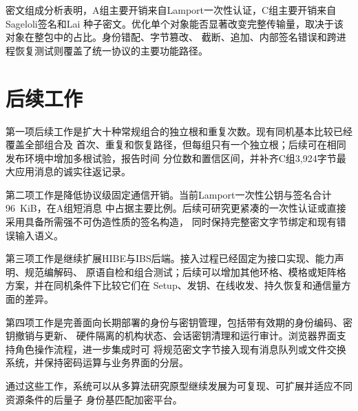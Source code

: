密文组成分析表明，A组主要开销来自Lamport一次性认证，C组主要开销来自Sageloli签名和Lai
种子密文。优化单个对象能否显著改变完整传输量，取决于该对象在整包中的占比。身份错配、字节篡改、
截断、追加、内部签名错误和跨进程恢复测试则覆盖了统一协议的主要功能路径。

\section{后续工作}

第一项后续工作是扩大十种常规组合的独立根和重复次数。现有同机基本比较已经覆盖全部组合及
首次、重复和恢复路径，但每组只有一个独立根；后续可在相同发布环境中增加多根试验，报告时间
分位数和置信区间，并补齐C组3,924字节最大应用消息的诚实往返记录。

第二项工作是降低协议级固定通信开销。当前Lamport一次性公钥与签名合计96~KiB，在A组短消息
中占据主要比例。后续可研究更紧凑的一次性认证或直接采用具备所需强不可伪造性质的签名构造，
同时保持完整密文字节绑定和现有错误输入语义。

第三项工作是继续扩展HIBE与IBS后端。接入过程已经固定为接口实现、能力声明、规范编解码、
原语自检和组合测试；后续可以增加其他环格、模格或矩阵格方案，并在同机条件下比较它们在
Setup、发钥、在线收发、持久恢复和通信量方面的差异。

第四项工作是完善面向长期部署的身份与密钥管理，包括带有效期的身份编码、密钥撤销与更新、
硬件隔离的机构状态、会话密钥清理和运行审计。浏览器界面支持角色操作流程，进一步集成时可
将规范密文字节接入现有消息队列或文件交换系统，并保持密码运算与业务界面的分层。

通过这些工作，系统可以从多算法研究原型继续发展为可复现、可扩展并适应不同资源条件的后量子
身份基匹配加密平台。
